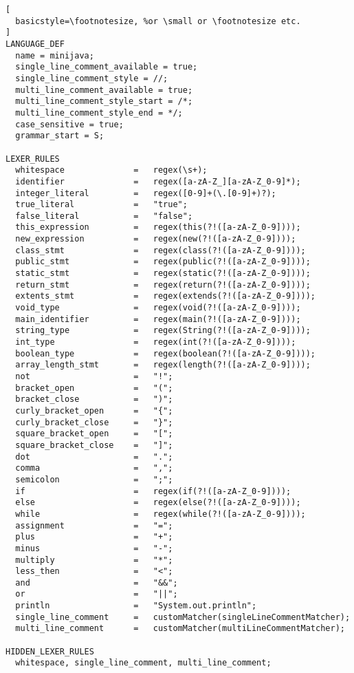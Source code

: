 \begin{lstlisting}[
  basicstyle=\footnotesize, %or \small or \footnotesize etc.
]
LANGUAGE_DEF
  name = minijava;
  single_line_comment_available = true;
  single_line_comment_style = //;
  multi_line_comment_available = true;
  multi_line_comment_style_start = /*;
  multi_line_comment_style_end = */;
  case_sensitive = true;
  grammar_start = S;

LEXER_RULES
  whitespace              =   regex(\s+);
  identifier              =   regex([a-zA-Z_][a-zA-Z_0-9]*);
  integer_literal         =   regex([0-9]+(\.[0-9]+)?);
  true_literal            =   "true";
  false_literal           =   "false";
  this_expression         =   regex(this(?!([a-zA-Z_0-9])));
  new_expression          =   regex(new(?!([a-zA-Z_0-9])));
  class_stmt              =   regex(class(?!([a-zA-Z_0-9])));
  public_stmt             =   regex(public(?!([a-zA-Z_0-9])));
  static_stmt             =   regex(static(?!([a-zA-Z_0-9])));
  return_stmt             =   regex(return(?!([a-zA-Z_0-9])));
  extents_stmt            =   regex(extends(?!([a-zA-Z_0-9])));
  void_type               =   regex(void(?!([a-zA-Z_0-9])));
  main_identifier         =   regex(main(?!([a-zA-Z_0-9])));
  string_type             =   regex(String(?!([a-zA-Z_0-9])));
  int_type                =   regex(int(?!([a-zA-Z_0-9])));
  boolean_type            =   regex(boolean(?!([a-zA-Z_0-9])));
  array_length_stmt       =   regex(length(?!([a-zA-Z_0-9])));
  not                     =   "!";
  bracket_open            =   "(";
  bracket_close           =   ")";
  curly_bracket_open      =   "{";
  curly_bracket_close     =   "}";
  square_bracket_open     =   "[";
  square_bracket_close    =   "]";
  dot                     =   ".";
  comma                   =   ",";
  semicolon               =   ";";
  if                      =   regex(if(?!([a-zA-Z_0-9])));
  else                    =   regex(else(?!([a-zA-Z_0-9])));
  while                   =   regex(while(?!([a-zA-Z_0-9])));
  assignment              =   "=";
  plus                    =   "+";
  minus                   =   "-";
  multiply                =   "*";
  less_then               =   "<";
  and                     =   "&&";
  or                      =   "||";
  println                 =   "System.out.println";
  single_line_comment     =   customMatcher(singleLineCommentMatcher);
  multi_line_comment      =   customMatcher(multiLineCommentMatcher);

HIDDEN_LEXER_RULES
  whitespace, single_line_comment, multi_line_comment;


\end{lstlisting}
